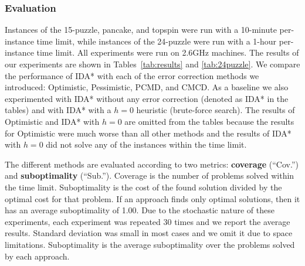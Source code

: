 \documentclass[letterpaper]{article}
\newcommand{\roni}[1]{\mbox{\tt RONI: #1}}
\begin{document}

\subsubsection{Evaluation}

Instances of the 15-puzzle, pancake, and topspin were run with a 10-minute per-instance time limit, while instances of the 24-puzzle were run with a 1-hour per-instance time limit. All experiments were run 
%
%
on 2.6GHz machines. %
The results of our experiments are shown in Tables~\ref{tab:results} and \ref{tab:24puzzle}. 
%
We compare the performance of IDA* with each of the error correction methods we introduced: Optimistic, Pessimistic, PCMD, and CMCD. As a baseline we also experimented with IDA* without any error correction (denoted as IDA* in the tables) and with IDA* with a $h=0$ heuristic (brute-force search). The results of Optimistic and IDA* with $h=0$ are omitted from the tables because the results for Optimistic were much worse than all other methods and the results of IDA* with $h=0$ did not solve any of the instances within the time limit. 

The different methods are evaluated according to two metrics: \textbf{coverage} (``Cov.'') and \textbf{suboptimality} (``Sub.''). Coverage is the number of problems solved within the time limit. %
Suboptimality is the cost of the found solution divided by the optimal cost for that problem. %
If an approach finds only optimal solutions, then it has an average suboptimality of 1.00.  
%
%
%
Due to the stochastic nature of these experiments, each experiment was repeated 30 times and we report the average results. Standard deviation was small in most cases and we omit it due to space limitations. Suboptimality is the average suboptimality over the problems solved by each approach.
\end{document}
